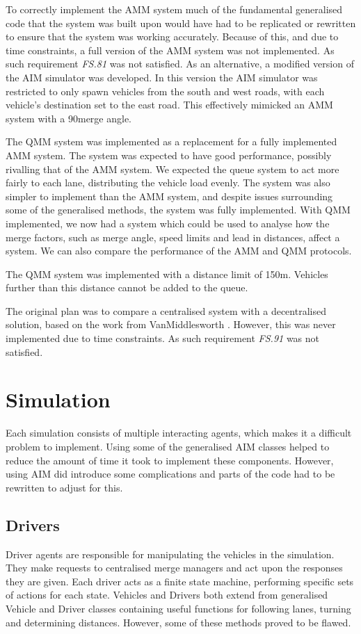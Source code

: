 To correctly implement the AMM system much of the fundamental generalised code that the system was built upon would have had to be replicated or rewritten to ensure that the system was working accurately. Because of this, and due to time constraints, a full version of the AMM system was not implemented. As such requirement \emph{FS.81} was not satisfied. As an alternative, a modified version of the AIM simulator was developed. In this version the AIM simulator was restricted to only spawn vehicles from the south and west roads, with each vehicle's destination set to the east road. This effectively mimicked an AMM system with a 90\degree merge angle.

The QMM system was implemented as a replacement for a fully implemented AMM system. The system was expected to have good performance, possibly rivalling that of the AMM system. We expected the queue system to act more fairly to each lane, distributing the vehicle load evenly. The system was also simpler to implement than the AMM system, and despite issues surrounding some of the generalised methods, the system was fully implemented. With QMM implemented, we now had a system which could be used to analyse how the merge factors, such as merge angle, speed limits and lead in distances, affect a system. We can also compare the performance of the AMM and QMM protocols.

The QMM system was implemented with a distance limit of 150\si{m}. Vehicles further than this distance cannot be added to the queue.

The original plan was to compare a centralised system with a decentralised solution, based on the work from VanMiddlesworth \citep{VanMiddlesworth2008}. However, this was never implemented due to time constraints. As such requirement \emph{FS.91} was not satisfied.

\section{Simulation}
\label{sec:Simulation}
Each simulation consists of multiple interacting agents, which makes it a difficult problem to implement. Using some of the generalised AIM classes helped to reduce the amount of time it took to implement these components. However, using AIM did introduce some complications and parts of the code had to be rewritten to adjust for this.

\subsection{Drivers}
\label{subsec:Drivers}
Driver agents are responsible for manipulating the vehicles in the simulation. They make requests to centralised merge managers and act upon the responses they are given. Each driver acts as a finite state machine, performing specific sets of actions for each state. Vehicles and Drivers both extend from generalised Vehicle and Driver classes containing useful functions for following lanes, turning and determining distances. However, some of these methods proved to be flawed.

